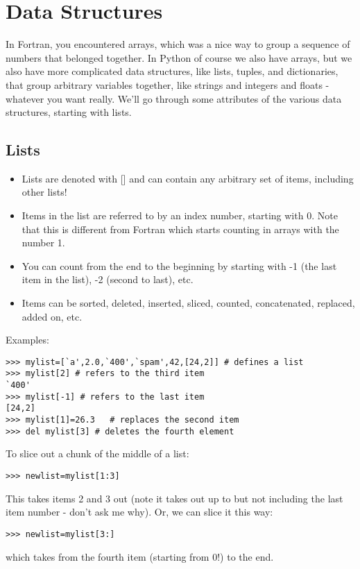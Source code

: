 \section{Data Structures}

In Fortran, you encountered arrays, which was a nice way to group a sequence of numbers that belonged together.  In Python of course we also have arrays, but we also have more complicated data structures, like lists, tuples, and dictionaries,  that group arbitrary variables together, like strings and integers and floats - whatever you want really. We'll go through some attributes of the various data structures, starting with lists.

\subsection{Lists}
\begin{itemize}
\item Lists are denoted with []  and can contain any arbitrary set of items, including other lists!
\item Items in the list are referred to by an index number, starting with 0.  Note that this is different from Fortran which starts counting in arrays with the number 1.
\item You can  count from the end to the beginning by starting with -1 (the last item in the list), -2 (second to last), etc. 
\item Items can be sorted, deleted, inserted, sliced, counted, concatenated, replaced, added on, etc.
\end{itemize}
\noindent
Examples:

{\singlespacing \color{blue} \begin{verbatim}
>>> mylist=[`a',2.0,`400',`spam',42,[24,2]] # defines a list
>>> mylist[2] # refers to the third item
`400'
>>> mylist[-1] # refers to the last item
[24,2]
>>> mylist[1]=26.3   # replaces the second item
>>> del mylist[3] # deletes the fourth element 
\end{verbatim}}


\noindent
To slice out a chunk of the middle of a list:
{\singlespacing \color{blue} \begin{verbatim}
>>> newlist=mylist[1:3]
\end{verbatim}}
\noindent
This takes items 2 and 3 out (note it takes out up to but not including the last item number - don't ask me why).  
Or, we can slice it this way:
{\singlespacing \color{blue} \begin{verbatim}
>>> newlist=mylist[3:] 
\end{verbatim}}
\noindent
which takes from the fourth item (starting from 0!) to the end. 


